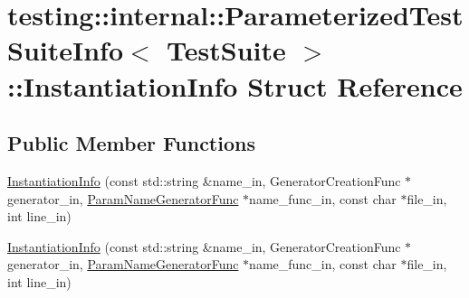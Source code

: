 \hypertarget{structtesting_1_1internal_1_1_parameterized_test_suite_info_1_1_instantiation_info}{}\section{testing\+::internal\+::Parameterized\+Test\+Suite\+Info$<$ Test\+Suite $>$\+::Instantiation\+Info Struct Reference}
\label{structtesting_1_1internal_1_1_parameterized_test_suite_info_1_1_instantiation_info}
\subsection*{Public Member Functions}
\begin{DoxyCompactItemize}
\item 
\mbox{\hyperlink{structtesting_1_1internal_1_1_parameterized_test_suite_info_1_1_instantiation_info_a1cde67cef70758ca16047040747e19c0}{Instantiation\+Info}} (const std\+::string \&name\+\_\+in, Generator\+Creation\+Func $\ast$generator\+\_\+in, \mbox{\hyperlink{classtesting_1_1internal_1_1_parameterized_test_suite_info_a3b4f232b7d6d3df941bb8e81b6b534a4}{Param\+Name\+Generator\+Func}} $\ast$name\+\_\+func\+\_\+in, const char $\ast$file\+\_\+in, int line\+\_\+in)
\item 
\mbox{\hyperlink{structtesting_1_1internal_1_1_parameterized_test_suite_info_1_1_instantiation_info_a1cde67cef70758ca16047040747e19c0}{Instantiation\+Info}} (const std\+::string \&name\+\_\+in, Generator\+Creation\+Func $\ast$generator\+\_\+in, \mbox{\hyperlink{classtesting_1_1internal_1_1_parameterized_test_suite_info_a3b4f232b7d6d3df941bb8e81b6b534a4}{Param\+Name\+Generator\+Func}} $\ast$name\+\_\+func\+\_\+in, const char $\ast$file\+\_\+in, int line\+\_\+in)
\end{DoxyCompactItemize}
